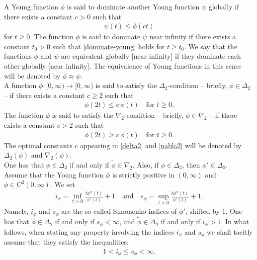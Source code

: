 \documentclass[leqno,11pt]{amsart}%
\numberwithin{equation}{section}
\theoremstyle{definition}
\numberwithin{equation}{section}
\begin{document}
  A Young function $\phi$ is said to dominate another Young function $\psi$ globally if there exists a constant $c>0$  such that
\begin{align}
    \label{dominate-young}
   \psi (t) \leq \phi(ct)
\end{align}
for $t \geq 0$. The function $\phi$ is said to dominate $\psi$ near infinity  
 if there exists a constant $t_0>0$ such that \eqref{dominate-young} holds for $t \geq t_0$.
 We say that the functions $\phi$ and $\psi$ are equivalent globally [near infinity] if they dominate each other globally [near infinity]. The equivalence of Young functions in this sense will be denoted by $\phi \approx \psi$.
\\
A  function $\phi : [0, \infty) \to [0,\infty)$ is said to satisfy the $\Delta_2$-condition -- briefly, $\phi \in \Delta_2$ -- if there exists a constant $c\geq 2$ such that
\begin{align}
    \label{delta2}
    \phi(2t)\le c\,\phi(t) \quad \text{for $t\geq 0$.}
\end{align}
The function $\phi$ is said to satisfy the $\nabla_2$-condition -- briefly, $\phi \in \nabla_2$ -- 
if there exists a constant $c>2$ such that
\begin{align}
    \label{nabla2}
    \phi(2t)\geq  c\,\phi(t) \quad \text{for $t\geq 0$.}
\end{align}
The optimal constants $c$
appearing in \eqref{delta2} and \eqref{nabla2} will be denoted by $\Delta_2(\phi)$ and $\nabla_2(\phi)$.
\\ One has that $\phi \in \Delta_2$ if and only if $\widetilde \phi \in \nabla_2$. Also, if $\phi \in \Delta_2$, then $\phi' \in \Delta_2$.
\\ Assume that the Young function $\phi$ is strictly positive in $(0, \infty)$ and $\phi \in C^2(0, \infty)$. We set 
\begin{align}
    \label{indices}
    i_\phi= \inf_{t>0} \frac{t\phi''(t)}{\phi'(t)} +1 \quad \text{and} \quad s_\phi= \sup_{t>0} \frac{t\phi''(t)}{\phi'(t)} +1.
\end{align}
Namely, $i_\phi$ and $s_\phi$ are the so called Simonenko indices of $\phi'$, shifted by $1$.
One has that $\phi \in \Delta_2$ if and only if $s_\phi <\infty$, and $\widetilde \phi \in \Delta_2$ if and only if $i_\phi>1$. In what follows, when stating any property involving the indices  $i_\phi$ and $s_\phi$ we shall tacitly assume that they satisfy the inequalities:
\begin{align}
    \label{indices3}
    1<i_\phi \leq s_\phi <\infty.
\end{align}
\end{document}
